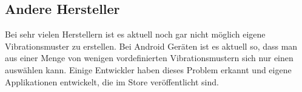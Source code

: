 \subsection{Andere Hersteller}
\label{ch:Grundlagen:sec:RelatedWork:subsec:PersonalisierteSmartwatch}
Bei sehr vielen Herstellern ist es aktuell noch gar nicht m{\"o}glich eigene Vibrationsmuster zu erstellen. 
Bei Android Ger{\"a}ten ist es aktuell so, dass man aus einer Menge von wenigen vordefinierten Vibrationsmustern sich nur einen ausw{\"a}hlen kann. 
Einige Entwickler haben dieses Problem erkannt und eigene Applikationen entwickelt, die im Store ver{\"o}ffentlicht sind.





